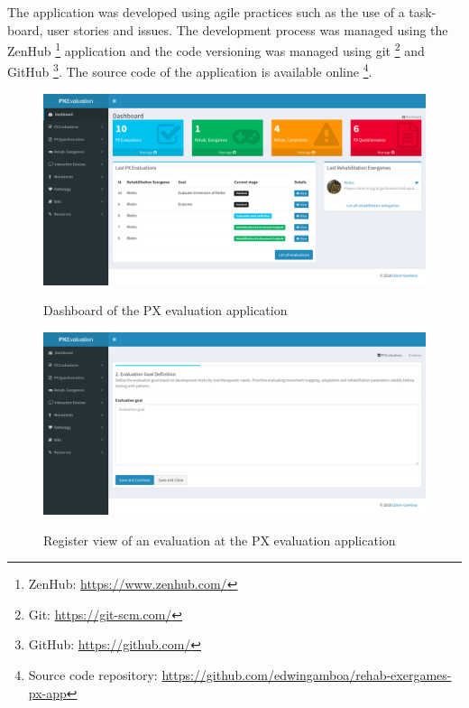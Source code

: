 The application was developed using agile practices such as the use of a task-board, user stories and issues. The development process was managed using the ZenHub \footnote{ZenHub: \url{https://www.zenhub.com/}} application and the code versioning was managed using git \footnote{Git: \url{https://git-scm.com/}} and GitHub \footnote{GitHub: \url{https://github.com/}}. The source code of the application is available online \footnote{Source code repository: \url{https://github.com/edwingamboa/rehab-exergames-px-app}}.

\begin{figure}[bth]
\myfloatalign
{\includegraphics[width=\linewidth]{gfx/app/dashboardApp}} \quad
\caption{Dashboard of the \ac{PX} evaluation application}\label{fig:dashboardApp}
\end{figure}

\begin{figure}[bth]
\myfloatalign
{\includegraphics[width=\linewidth]{gfx/app/evaluationApp1}} \quad
\caption{Register view of an evaluation at the \ac{PX} evaluation application}\label{fig:evaluationApp1}
\end{figure}

